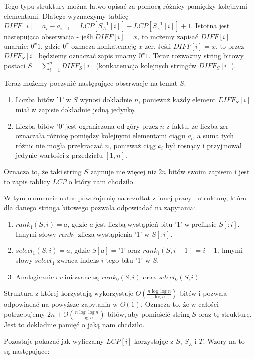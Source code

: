 \documentclass{article}
\begin{document}
Tego typu struktury można łatwo opisać za pomocą różnicy pomiędzy kolejnymi elementami. Dlatego wyznaczymy tablicę $DIFF[i] = a_i - a_{i-1} = LCP[S_A^{-1}[i]] - LCP[S_A^{-1}[i]] + 1$. Istotna jest następująca obserwacja - jeśli $DIFF[i] = x$, to możemy zapisać $DIFF[i]$ unarnie: $0^x1$, gdzie $0^x$ oznacza konkatenację $x$ zer. Jeśli $DIFF[i] = x$, to przez $DIFF_S[i]$ będziemy oznaczać zapis unarny $0^x1$. Teraz rozważmy string bitowy postaci $S = \sum_{i=1}^n DIFF_S[i]$ (konkatenacja kolejnych stringów $DIFF_S[i]$).

Teraz możemy poczynić następujące obserwacje na temat $S$:
\begin{enumerate}
    \item Liczba bitów '1' w $S$ wynosi dokładnie $n$, ponieważ każdy element $DIFF_S[i]$ miał w zapisie dokładnie jedną jedynkę.
    \item Liczba bitów '0' jest ograniczona od góry przez $n$ z faktu, ze liczba zer oznaczała różnicę pomiędzy kolejnymi elementami ciągu $a_i$, a suma tych różnic nie mogła przekraczać $n$, ponieważ ciąg $a_i$ był rosnący i przyjmował jedynie wartości z przedziału $[1,n]$.
\end{enumerate}

Oznacza to, że taki string $S$ zajmuje nie więcej niż $2n$ bitów swoim zapisem i jest to zapis tablicy $LCP$ o który nam chodziło.

W tym momencie autor powołuje się na rezultat z innej pracy - strukturę, która dla danego stringa bitowego pozwala odpowiadać na zapytania:
\begin{enumerate}
    \item $rank_1(S, i) = a$, gdzie $a$ jest liczbą wystąpień bitu '1' w prefiksie $S[:i]$. Innymi słowy $rank_1$ zlicza wystąpienia '1' w $S[:i]$.
    \item $select_1(S, i) = a$, gdzie $S[a] = $'1' oraz $rank_1(S, i-1) = i-1$. Innymi słowy $select_1$ zwraca indeks $i$-tego bitu '1' w $S$.
    \item Analogicznie definiowane są $rank_0(S, i)$ oraz $select_0(S, i)$.
\end{enumerate}

Struktura z której korzystają wykorzystuje $O(\frac{n \log{\log{n}}}{\log{n}})$ bitów i pozwala odpowiadać na powyższe zapytania w $O(1)$. Oznacza to, że w całości potrzebujemy $2n + O(\frac{n \log{\log{n}}}{\log{n}})$ bitów, aby pomieścić string $S$ oraz tę strukturę. Jest to dokładnie pamięć o jaką nam chodziło.

Pozostaje pokazać jak wyliczamy $LCP[i]$ korzystając z $S$, $S_A$ i $T$. Wzory na to są następujące:
\end{document}
